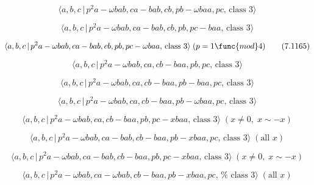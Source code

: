 \documentclass[10pt]{article}
\begin{document}
\begin{equation}
\langle a,b,c\,|\,p^{2}a-\omega bab,ca-bab,cb,pb-\omega baa,pc,\,\text{class 
}3\rangle  \tag{7.1163}
\end{equation}

\begin{equation}
\langle a,b,c\,|\,p^{2}a-\omega bab,ca-bab,cb,pb,pc-baa,\,\text{class }%
3\rangle  \tag{7.1164}
\end{equation}

\begin{equation}
\langle a,b,c\,|\,p^{2}a-\omega bab,ca-bab,cb,pb,pc-\omega baa,\,\text{class 
}3\rangle \;(p=1\func{mod}4)  \tag{7.1165}
\end{equation}

\begin{equation}
\langle a,b,c\,|\,p^{2}a-\omega bab,ca,cb-baa,pb,pc,\,\text{class }3\rangle 
\tag{7.1166}
\end{equation}

\begin{equation}
\langle a,b,c\,|\,p^{2}a-\omega bab,ca,cb-baa,pb-baa,pc,\,\text{class }%
3\rangle  \tag{7.1167}
\end{equation}

\begin{equation}
\langle a,b,c\,|\,p^{2}a-\omega bab,ca,cb-baa,pb-\omega baa,pc,\,\text{class 
}3\rangle  \tag{7.1168}
\end{equation}

\begin{equation}
\langle a,b,c\,|\,p^{2}a-\omega bab,ca,cb-baa,pb,pc-xbaa,\,\text{class }%
3\rangle \;(x\neq 0,\;x\sim -x)  \tag{7.1169}
\end{equation}

\begin{equation}
\langle a,b,c\,|\,p^{2}a-\omega bab,ca-bab,cb-baa,pb-xbaa,pc,\,\text{class }%
3\rangle \;(\text{all }x)  \tag{7.1170}
\end{equation}

\begin{equation}
\langle a,b,c\,|\,p^{2}a-\omega bab,ca-bab,cb-baa,pb,pc-xbaa,\,\text{class }%
3\rangle \;(x\neq 0,\;x\sim -x)  \tag{7.1171}
\end{equation}

\begin{equation}
\langle a,b,c\,|\,p^{2}a-\omega bab,ca-\omega bab,cb-baa,pb-xbaa,pc,\,\text{%
class }3\rangle \;(\text{all }x)  \tag{7.1172}
\end{equation}
\end{document}

